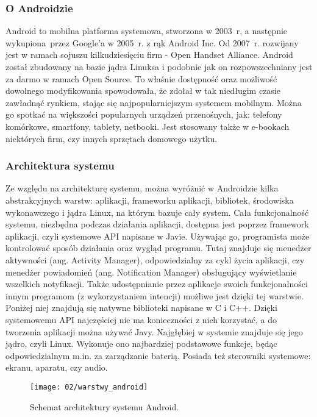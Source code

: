 \subsubsection*{O Androidzie}

Android to mobilna platforma systemowa, stworzona w 2003~r, a następnie wykupiona przez Google'a w 2005~r. z rąk Android Inc. Od 2007~r. rozwijany jest w ramach sojuszu kilkudziesięciu firm - Open Handset Alliance. Android został zbudowany na bazie jądra Linuksa i podobnie jak on rozpowszechniany jest za darmo w ramach Open Source. To właśnie dostępność oraz możliwość dowolnego modyfikowania spowodowała, że zdołał w tak niedługim czasie zawładnąć rynkiem, stając się najpopularniejszym systemem mobilnym. Można go spotkać na większości popularnych urządzeń przenośnych, jak: telefony komórkowe, smartfony, tablety, netbooki. Jest stosowany także w e-bookach niektórych firm, czy innych sprzętach domowego użytku. 

\subsubsection*{Architektura systemu}
Ze względu na architekturę systemu, można wyróżnić w Androidzie kilka abstrakcyjnych warstw: aplikacji, frameworku aplikacji, bibliotek, środowiska wykonawczego i jądra Linux, na którym bazuje cały system. Cała funkcjonalność systemu, niezbędna podczas działania aplikacji, dostępna jest poprzez framework aplikacji, czyli systemowe API napisane w Javie. Używając go, programista może kontrolować sposób działania oraz wygląd programu. Tutaj znajduje się menedżer aktywności (ang. Activity Manager), odpowiedzialny za cykl życia aplikacji, czy menedżer powiadomień (ang. Notification Manager) obsługujący wyświetlanie wszelkich notyfikacji. Także udostępnianie przez aplikacje swoich funkcjonalności innym programom (z wykorzystaniem intencji) możliwe jest dzięki tej warstwie. Poniżej niej znajdują się natywne biblioteki napisane w C i C++. Dzięki systemowemu API najczęściej nie ma konieczności z nich korzystać, a do tworzenia aplikacji można używać Javy. Najgłębiej w systemie znajduje się jego jądro, czyli Linux. Wykonuje ono najbardziej podstawowe funkcje, będąc odpowiedzialnym m.in. za zarządzanie baterią. Posiada też sterowniki systemowe: ekranu, aparatu, czy audio.

\begin{figure}[h]
	\begin{center}
		\texttt{[image: 02/warstwy\_android]}
	\end{center}
	\caption{Schemat architektury systemu Android.}
\end{figure}

